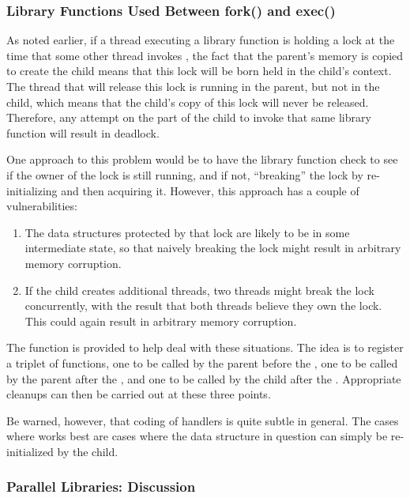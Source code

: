 \subsubsection{Library Functions Used Between fork() and exec()}
\label{sec:locking:Library Functions Used Between fork() and exec()}

As noted earlier, if a thread executing a library function is holding
a lock at the time that some other thread invokes , the
fact that the parent's memory is copied to create the child means that
this lock will be born held in the child's context.
The thread that will release this lock is running in the parent, but not
in the child, which means that the child's copy of this lock will never
be released.
Therefore, any attempt on the part of the child to invoke that same
library function will result in deadlock.

One approach to this problem would be to have the library function
check to see if the owner of the lock is still running, and if not,
``breaking'' the lock by re-initializing and then acquiring it.
However, this approach has a couple of vulnerabilities:

\begin{enumerate}
\item	The data structures protected by that lock are likely to
	be in some intermediate state, so that naively breaking the lock
	might result in arbitrary memory corruption.
\item	If the child creates additional threads, two threads might
	break the lock concurrently, with the result that both
	threads believe they own the lock.
	This could again result in arbitrary memory corruption.
\end{enumerate}

The  function is provided to help deal with these situations.
The idea is to register a triplet of functions, one to be called by the
parent before the , one to be called by the parent after the
, and one to be called by the child after the .
Appropriate cleanups can then be carried out at these three points.

Be warned, however, that coding of  handlers is quite subtle
in general.
The cases where  works best are cases where the data structure
in question can simply be re-initialized by the child.

\subsubsection{Parallel Libraries: Discussion}
\label{sec:locking:Parallel Libraries: Discussion}

